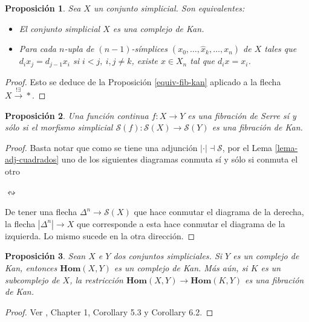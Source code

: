 \documentclass[11pt]{report}
\theoremstyle{colored}
\newtheorem{proposition}{Proposición}[section]
\renewcommand{\ss}[1]{\Delta^{#1}}
\newcommand{\horn}[2]{\Lambda^{#1}_{#2}}
\newcommand{\homcomplex}{\mathbf{Hom}}
\begin{document}
\begin{proposition} Sea $X$ un conjunto simplicial. Son equivalentes:
\begin{itemize}
\item[(i)] El conjunto simplicial $X$ es una complejo de Kan.
\item[(ii)] Para cada $n$-upla de $(n-1)$-símplices $(x_0,\dots,\widehat{x}_k,\dots, x_n)$ de $X$ tales que $d_ix_j = d_{j-1}x_i$ si $i < j, \ i,j \neq k$, existe $x \in X_n$ tal que $d_ix = x_i$.
\end{itemize}
\end{proposition}
\begin{proof} Esto se deduce de la Proposición \ref{equiv-fib-kan} aplicado a la flecha $X \xrightarrow{! \exists} \ast$.
\end{proof}

\begin{proposition} Una función continua $f : X \to Y$ es una fibración de Serre sí y sólo si el morfismo simplicial $\mathcal{S}(f) : \mathcal{S}(X) \to \mathcal{S}(Y)$ es una fibración de Kan.
\end{proposition}
\begin{proof} Basta notar que como se tiene una adjunción $| \cdot | \dashv \mathcal{S}$, por el Lema \ref{lema-adj-cuadrados} uno de los siguientes diagramas conmuta sí y sólo si conmuta el otro
\begin{center}
\quad$\leftrightsquigarrow$\quad
{}
\end{center}

De tener una flecha $\ss{n} \to \mathcal{S}(X)$ que hace conmutar el diagrama de la derecha, la flecha $|\ss{n}| \to X$ que corresponde a esta hace conmutar el diagrama de la izquierda. Lo mismo sucede en la otra dirección.
\end{proof}

\begin{proposition} \label{homcomplex-kan} Sean $X$ e $Y$ dos conjuntos simpliciales. Si $Y$ es un complejo de Kan, entonces $\homcomplex(X,Y)$ es un complejo de Kan. Más aún, si $K$ es un subcomplejo de $X$, la restricción $\homcomplex(X,Y) \to \homcomplex(K,Y)$ es una fibración de Kan.
\end{proposition}
\begin{proof} Ver \cite{GJ}, Chapter 1, Corollary 5.3 y Corollary 6.2.
\end{proof}
\end{document}
